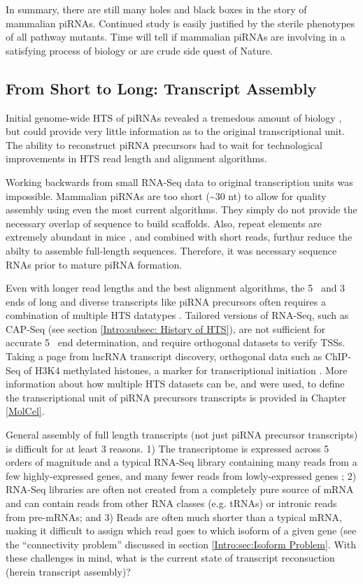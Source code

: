     In summary, there are still many holes and black boxes in the story of mammalian piRNAs. Continued study is easily justified by the sterile phenotypes of all pathway mutants. Time will tell if mammalian piRNAs are involving in a satisfying process of biology or are crude side quest of Nature.


  \subsection{From Short to Long: Transcript Assembly}
    \label{Intro:subsec:Tx Assembly}

    Initial genome-wide HTS of piRNAs revealed a tremedous amount of biology \citep{Gunawardane2007,Brennecke2007}, but could provide very little information as to the original transcriptional unit. The ability to reconstruct piRNA precursors had to wait for technological improvements in HTS read length and alignment algorithms.

    Working backwards from small RNA-Seq data to original transcription units was impossible. Mammalian piRNAs are too short (\textasciitilde30 nt) to allow for quality assembly using even the most current algorithms. They simply do not provide the necessary overlap of sequence to build scaffolds. Also, repeat elements are extremely abundant in mice \citep{Nellaker2012}, and combined with short reads, furthur reduce the abilty to assemble full-length sequences. Therefore, it was necessary sequence RNAs prior to mature piRNA formation.

    Even with longer read lengths and the best alignment algorithms, the 5\textprime~ and 3\textprime~ ends of long and diverse transcripts like piRNA precursors often requires a combination of multiple HTS datatypes \citep{Blower2013}. Tailored versions of RNA-Seq, such as CAP-Seq (see section \ref{Intro:subsec: History of HTS}), are not sufficient for accurate 5\textprime~ end determination, and require orthogonal datasets to verify TSSs. Taking a page from lncRNA transcript discovery, orthogonal data such as ChIP-Seq of H3K4 methylated histones, a marker for transcriptional initiation \citep{Khalil2009}. More information about how multiple HTS datasets can be, and were used, to define the transcriptional unit of piRNA precursors transcripts is provided in Chapter \ref{MolCel}.

    General assembly of full length transcripts (not just piRNA precursor transcripts) is difficult for at least 3 reasons. 1) The transcriptome is expressed across 5 orders of magnitude and a typical RNA-Seq library containing many reads from a few highly-expressed genes, and many fewer reads from lowly-expressed genes \citep{Blencowe2009}; 2) RNA-Seq libraries are often not created from a completely pure source of mRNA and can contain reads from other RNA classes (e.g. tRNAs) or intronic reads from pre-mRNAs; and 3) Reads are often much shorter than a typical mRNA, making it difficult to assign which read goes to which isoform of a given gene (see the ``connectivity problem'' discussed in section \ref{Intro:sec:Isoform Problem}. With these challenges in mind, what is the current state of transcript reconsuction (herein transcript assembly)?

